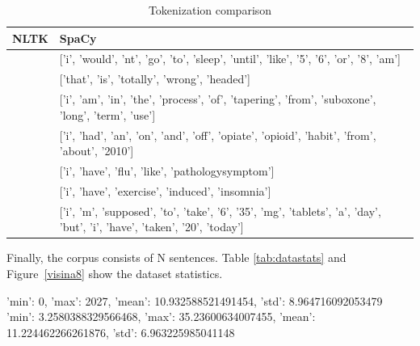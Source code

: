 \documentclass[11pt]{article}
\begin{document}
\begin{center}
\begin{table}
\begin{tabular}{ |p{7cm}|p{7cm}| }
\hline
NLTK & SpaCy \\ \hline
['i', 'wouldnt', 'go', 'to', 'sleep', 'until', 'like', '5', '6', 'or', '8am'] & 
['i', 'would', 'nt', 'go', 'to', 'sleep', 'until', 'like', '5', '6', 'or', '8', 'am'] \\ \hline
['that', 'is', 'totally', 'wrongheaded'] & ['that', 'is', 'totally', 'wrong', 'headed'] \\ \hline
['i', 'am', 'in', 'the', 'process', 'of', 'tapering', 'from', 'suboxone', 'longterm', 'use'] & 
['i', 'am', 'in', 'the', 'process', 'of', 'tapering', 'from', 'suboxone', 'long', 'term', 'use'] \\ \hline
['i', 'had', 'an', 'onandoff', 'opiateopioid', 'habit', 'from', 'about', '2010'] & 
['i', 'had', 'an', 'on', 'and', 'off', 'opiate', 'opioid', 'habit', 'from', 'about', '2010'] \\ 
\hline
['i', 'have', 'flulike', 'pathologysymptom'] & ['i', 'have', 'flu', 'like', 'pathologysymptom'] \\ \hline
['i', 'have', 'exerciseinduced', 'insomnia'] & ['i', 'have', 'exercise', 'induced', 'insomnia'] \\ \hline
['i', 'm', 'supposed', 'to', 'take', '6', '35mg', 'tablets', 'a', 'day', 'but', 'i', 'have', 'taken', '20', 'today'] & 
['i', 'm', 'supposed', 'to', 'take', '6', '35', 'mg', 'tablets', 'a', 'day', 'but', 'i', 'have', 'taken', '20', 'today'] \\ 
\hline
\end{tabular}	
\caption{\label{token_dif}Tokenization comparison}
\end{table}
\end{center}


Finally, the corpus consists of N  sentences. Table \ref{tab:datastats} and Figure~\ref{visina8} show the dataset statistics.


{'min': 0, 'max': 2027, 'mean': 10.932588521491454, 'std': 8.964716092053479}
{'min': 3.2580388329566468, 'max': 35.23600634007455, 'mean': 11.224462266261876, 'std': 6.963225985041148}
\end{document}
